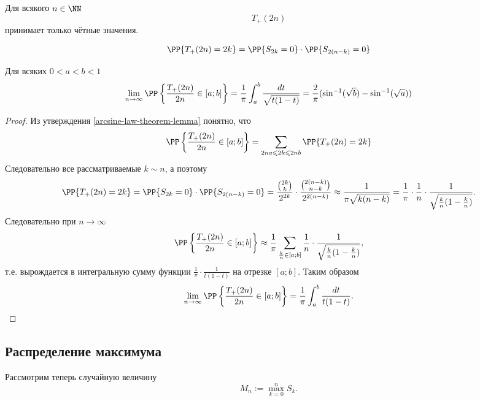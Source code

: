 \documentclass[12pt,a4paper]{article}
\begin{document}
    \begin{exercise}
        Для всякого $n \in \NN$
        \[T_+(2n)\]
        принимает только чётные значения.
    \end{exercise}

    \begin{lemma}\label{arcsine-law-theorem-lemma}
        \[\PP\{T_+(2n) = 2k\} = \PP\{S_{2k} = 0\} \cdot \PP\{S_{2(n-k)} = 0\}\]
    \end{lemma}

    \begin{theorem}
        Для всяких $0 < a < b < 1$
        \[
            \lim_{n \to \infty} \PP\left\{\frac{T_+(2n)}{2n} \in [a; b]\right\}
            = \frac{1}{\pi} \int_a^b \frac{dt}{\sqrt{t(1-t)}}
            = \frac{2}{\pi} (\sin^{-1}(\sqrt{b}) - \sin^{-1}(\sqrt{a}))
        \]
    \end{theorem}

    \begin{proof}
        Из утверждения \ref{arcsine-law-theorem-lemma} понятно, что
        \[
            \PP\left\{\frac{T_+(2n)}{2n} \in [a; b]\right\}
            = \sum_{2na \leqslant 2k \leqslant 2nb} \PP\{T_+(2n) = 2k\}
        \]
        Следовательно все рассматриваемые $k \sim n$, а поэтому
        \[
            \PP\{T_+(2n) = 2k\}
            = \PP\{S_{2k} = 0\} \cdot \PP\{S_{2(n-k)} = 0\}
            = \frac{\binom{2k}{k}}{2^{2k}} \cdot \frac{\binom{2(n-k)}{n-k}}{2^{2(n-k)}}
            \approx \frac{1}{\pi \sqrt{k(n-k)}}
            = \frac{1}{\pi} \cdot \frac{1}{n} \cdot \frac{1}{\sqrt{\frac{k}{n}(1-\frac{k}{n})}}.
        \]
        Следовательно при $n \to \infty$
        \[
            \PP\left\{\frac{T_+(2n)}{2n} \in [a; b]\right\}
            \approx \frac{1}{\pi} \sum_{\frac{k}{n} \in [a; b]} \frac{1}{n} \cdot \frac{1}{\sqrt{\frac{k}{n}(1-\frac{k}{n})}},
        \]
        т.е. вырождается в интегральную сумму функции $\frac{1}{\pi} \cdot \frac{1}{t(1-t)}$ на отрезке $[a; b]$. Таким образом
        \[\lim_{n \to \infty} \PP\left\{\frac{T_+(2n)}{2n} \in [a; b]\right\} = \frac{1}{\pi} \int_a^b \frac{dt}{t(1-t)}.\]
    \end{proof}

    \subsection{Распределение максимума}

    Рассмотрим теперь случайную величину
    \[M_n := \max_{k = 0}^n S_k.\]
    
\end{document}
